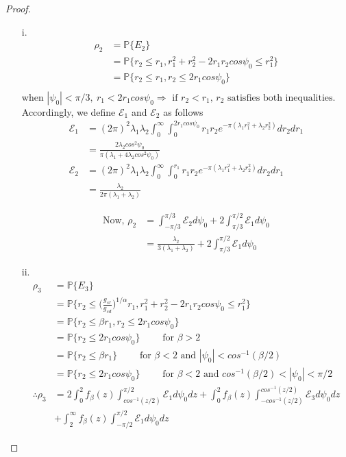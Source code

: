 \documentclass[titlepage]{article}
\begin{document}
\begin{proof}
\begin{itemize}
\item[i.] 
\begin{align*}
\rho_2 &= \mathbb{P}\{E_2\} \\
&= \mathbb{P}\{r_2 \leq r_1, r_1^2+r_2^2-2r_1r_2cos\psi_0 \leq r_1^2\} \\
&= \mathbb{P}\{r_2 \leq r_1, r_2 \leq 2 r_1 cos\psi_0 \} \\
\end{align*}
when $|\psi_0|<\pi/3, ~ r_1 < 2r_1cos\psi_0  \Rightarrow \text{ if } r_2 < r_1 \text{, $r_2$ satisfies both inequalities.}$ Accordingly, we define $\mathcal{E}_1$ and $\mathcal{E}_2$ as follows
\begin{align*}
\mathcal{E}_1 &= (2\pi)^2\lambda_1 \lambda_2 \int_0^\infty \int_0^{2r_1 cos\psi_0}r_1r_2e^{-\pi(\lambda_1 r_1^2 + \lambda_2 r_2^2)}dr_2 dr_1 \\
&= \frac{2\lambda_2 cos^2\psi_0}{\pi(\lambda_1+4\lambda_2cos^2\psi_0)} \\
\mathcal{E}_2 &= (2\pi)^2\lambda_1 \lambda_2 \int_0^\infty \int_0^{r_1}r_1r_2e^{-\pi(\lambda_1 r_1^2 + \lambda_2 r_2^2)}dr_2 dr_1 \\
&= \frac{\lambda_2}{2\pi(\lambda_1+\lambda_2)}
\end{align*}
 
\begin{align*}
\text{Now, }\rho_2 &= \int_{-\pi/3}^{\pi/3} \mathcal{E}_2 d\psi_0 + 2\int_{\pi/3}^{\pi/2} \mathcal{E}_1d\psi_0 \\
&=  \frac{\lambda_2}{3(\lambda_1+\lambda_2)} + 2\int_{\pi/3}^{\pi/2} \mathcal{E}_1d\psi_0
\end{align*} 

\item[ii.]
\begin{align*}
\rho_3 &= \mathbb{P}\{E_3\} \\
&= \mathbb{P}\{r_2 \leq \bigg(\frac{g_{sr}}{g_{sd}} \bigg)^{1/\alpha}r_1, r_1^2+r_2^2-2r_1r_2cos\psi_0 \leq r_1^2\} \\
&= \mathbb{P}\{r_2 \leq \beta r_1, r_2 \leq 2 r_1 cos\psi_0 \} \\
&= \mathbb{P}\{r_2 \leq 2 r_1 cos\psi_0 \} \qquad \text{ for } \beta > 2 \\
&= \mathbb{P}\{r_2 \leq \beta r_1\} \qquad \text{ for } \beta < 2  \text{ and } |\psi_0| < cos^{-1}(\beta/2) \\
&= \mathbb{P}\{r_2 \leq 2 r_1 cos\psi_0 \} \qquad \text{ for } \beta < 2 \text{ and } cos^{-1}(\beta/2) < |\psi_0| <  \pi/2 \\
\therefore \rho_3&= 2 \int_0^2 f_{\beta}(z)\int^{\pi/2}_{cos^{-1}(z/2)}\mathcal{E}_1 d\psi_0 dz +\int_0^2 f_{\beta}(z)\int_{-cos^{-1}(z/2)}^{cos^{-1}(z/2)}\mathcal{E}_3 d\psi_0dz \\&+ \int_2^{\infty} f_{\beta}(z)\int_{-\pi/2}^{\pi/2}\mathcal{E}_1 d\psi_0 dz
\end{align*}


\end{itemize}
\end{proof}
\end{document}
